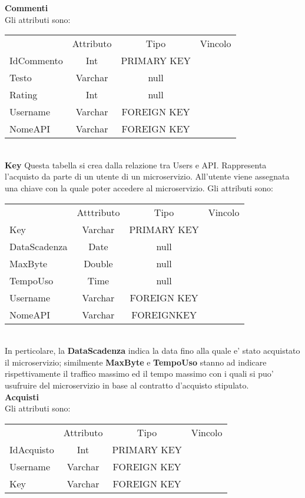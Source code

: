 {{		\textbf{Commenti}\\
			Gli attributi sono:
			\begin{center}
			\begin{tabular}{lccc}
				&Attributo&Tipo&Vincolo\\
				IdCommento&Int&PRIMARY KEY\\
				Testo&Varchar&null \\
				Rating&Int&null \\
				Username&Varchar&FOREIGN KEY\\
				NomeAPI&Varchar&FOREIGN KEY\\
			\end{tabular}
			\end{center}\\
		
		\textbf{Key}
			Questa tabella si crea dalla relazione tra Users e API. Rappresenta l'acquisto da parte di un utente di un microservizio. All'utente viene assegnata una chiave con la quale poter accedere al microservizio. Gli attributi sono:
			\begin{center}
			\begin{tabular}{lccc}
				&Atttributo&Tipo&Vincolo\\
				Key&Varchar&PRIMARY KEY\\
				DataScadenza&Date&null \\
				MaxByte&Double&null \\
				TempoUso&Time&null \\
				Username&Varchar&FOREIGN KEY\\
				NomeAPI&Varchar&FOREIGNKEY\\			
			\end{tabular}
			\end{center}\\
			In perticolare, la \textbf{DataScadenza} indica la data fino alla quale e' stato acquistato il microservizio; similmente \textbf{MaxByte} e \textbf{TempoUso} stanno ad indicare rispettivamente il traffico massimo ed il tempo massimo con i quali si puo' usufruire del microservizio in base al contratto d'acquisto stipulato.\\
			
		\textbf{Acquisti}\\
		Gli attributi sono: \\
		\begin{center}
		\begin{tabular}{lccc}
			&Attributo&Tipo&Vincolo\\
			IdAcquisto&Int&PRIMARY KEY\\
			Username&Varchar&FOREIGN KEY\\
			Key&Varchar&FOREIGN KEY\\
		\end{tabular}
		\end{center}\\
			
}}
